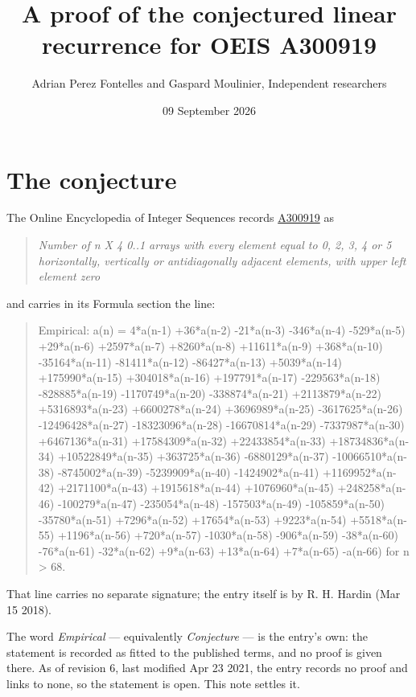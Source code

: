 \documentclass[11pt]{article}
\title{A proof of the conjectured linear recurrence for OEIS A300919}
\author{Adrian Perez Fontelles and Gaspard Moulinier, Independent researchers}
\date{09 September 2026}
\theoremstyle{definition}
\begin{document}
\maketitle
\section{The conjecture}

The Online Encyclopedia of Integer Sequences records \href{https://oeis.org/A300919}{A300919} as

\begin{quote}\itshape Number of n X 4 0..1 arrays with every element equal to 0, 2, 3, 4 or 5 horizontally, vertically or antidiagonally adjacent elements, with upper left element zero\end{quote}

and carries in its Formula section the line:

\begin{quote}\ttfamily Empirical: a(n) = 4*a(n-1) +36*a(n-2) -21*a(n-3) -346*a(n-4) -529*a(n-5) +29*a(n-6) +2597*a(n-7) +8260*a(n-8) +11611*a(n-9) +368*a(n-10) -35164*a(n-11) -81411*a(n-12) -86427*a(n-13) +5039*a(n-14) +175990*a(n-15) +304018*a(n-16) +197791*a(n-17) -229563*a(n-18) -828885*a(n-19) -1170749*a(n-20) -338874*a(n-21) +2113879*a(n-22) +5316893*a(n-23) +6600278*a(n-24) +3696989*a(n-25) -3617625*a(n-26) -12496428*a(n-27) -18323096*a(n-28) -16670814*a(n-29) -7337987*a(n-30) +6467136*a(n-31) +17584309*a(n-32) +22433854*a(n-33) +18734836*a(n-34) +10522849*a(n-35) +363725*a(n-36) -6880129*a(n-37) -10066510*a(n-38) -8745002*a(n-39) -5239909*a(n-40) -1424902*a(n-41) +1169952*a(n-42) +2171100*a(n-43) +1915618*a(n-44) +1076960*a(n-45) +248258*a(n-46) -100279*a(n-47) -235054*a(n-48) -157503*a(n-49) -105859*a(n-50) -35780*a(n-51) +7296*a(n-52) +17654*a(n-53) +9223*a(n-54) +5518*a(n-55) +1196*a(n-56) +720*a(n-57) -1030*a(n-58) -906*a(n-59) -38*a(n-60) -76*a(n-61) -32*a(n-62) +9*a(n-63) +13*a(n-64) +7*a(n-65) -a(n-66) for n > 68.\end{quote}

That line carries no separate signature; the entry itself is by R. H. Hardin (Mar 15 2018).

The word {\itshape Empirical} --- equivalently {\itshape Conjecture} --- is the entry's own: the statement is recorded as fitted to the published terms, and no proof is given there. As of revision 6, last modified Apr 23 2021, the entry records no proof and links to none, so the statement is open. This note settles it.
\end{document}
